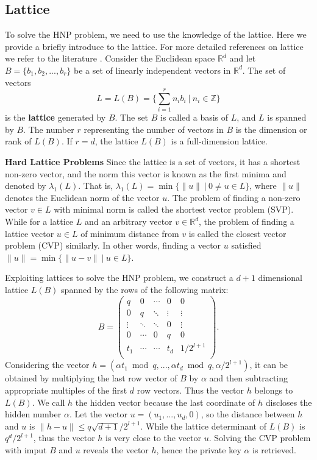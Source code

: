 \subsection{Lattice}
\label{intro_lattice}
To solve the HNP problem, we need to use the knowledge of the lattice.
Here we provide a briefly introduce to the lattice.
For more detailed references on lattice we refer to the literature \cite{latticereduction2000}.
Consider the Euclidean space $\mathbb{R}^{d}$
 and let $B = \{b_1, b_2, ..., b_r\}$ be a set of linearly independent vectors in $\mathbb{R}^d$.
The set of vectors
$$
L = L(B) = \{\sum_{i=1}^{r}{n_ib_i} \  |\ n_i \in \mathbb{Z} \}
$$
is the \textbf{lattice} generated by $B$.
The set $B$ is called a basis of $L$, and $L$ is spanned by $B$.
The number $r$ representing the number of vectors in $B$ is the dimension or rank of $L(B)$.
If $r = d$, the lattice $L(B)$ is a full-dimension lattice.

\noindent\textbf{Hard Lattice Problems} Since the lattice is a set of vectors,
 it has a shortest non-zero vector, and the norm this vector is known as the first minima and denoted by $\lambda_1(L)$.
That is, $\lambda_1(L) = \min\{\|u\| \ |\  0 \neq u \in L\}$, where $\|u\|$ denotes the Euclidean norm of the vector $u$.
The problem of finding a non-zero vector $v \in L$ with minimal norm is called the shortest vector problem (SVP).
 While for a lattice $L$ and an arbitrary vector $v \in \mathbb{R}^d$,
 the problem of finding a lattice vector $u \in L$ of minimum distance from $v$ is called the closest vector problem (CVP) similarly.
  In other words, finding a vector $u$ satisfied $\|u\| = \min\{\|u - v\| \ |\   u \in L\}$.

Exploiting lattices to solve the HNP problem, we construct a $d+1$ dimensional lattice $L(B)$ spanned by the rows of the following matrix:
$$B =
\left(
  \begin{array}{ccccc}
    q & 0 & \cdots & 0 & 0 \\
    0 & q & \ddots & \vdots & \vdots \\
    \vdots & \ddots & \ddots & 0 & \vdots \\
    0 & \cdots & 0 & q & 0 \\
    t_1 & \cdots & \cdots & t_d & 1/2^{l+1} \\
  \end{array}
\right).
$$
Considering the vector $h = (\alpha t_1 \bmod q, ..., \alpha t_d \bmod q, \alpha /2^{l+1})$,
 it can be obtained by multiplying the last row vector of $B$ by $\alpha$ and then subtracting appropriate multiples of the first $d$ row vectors.
Thus the vector $h$ belongs to $L(B)$.
We call $h$ the hidden vector because the last coordinate of $h$ discloses the hidden number $\alpha$.
Let the vector $u = (u_1, ..., u_d, 0)$,
 so the distance between $h$ and $u$ is $\|h - u\| \leq q\sqrt{d+1}/2^{l+1}$.
While the lattice determinant of $L(B)$ is $q^d/2^{l+1}$,
 thus the vector $h$ is very close to the vector $u$.
Solving the CVP problem with imput $B$ and $u$ reveals the vector $h$,
 hence the private key $\alpha$ is retrieved.

